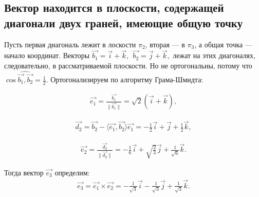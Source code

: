 \documentclass[12pt,a4paper]{article}
\begin{document}
\subsection{Вектор находится в плоскости, содержащей диагонали двух граней, имеющие общую точку}

Пусть первая диагональ лежит в лоскости $\pi_{2}$, вторая --- в $\pi_{3}$, а общая точка --- начало координат. Векторы $\vec{b_{1}}=\vec{i}+\vec{k},~~ \vec{b_{2}}=\vec{j}+\vec{k},$ лежат на этих диагоналях, следовательно, в рассматриваемой плоскости. Но не ортогональны, потому что $\cos{\widehat{\vec{b_{1}}, \vec{b_{2}}}}=\frac{1}{2}.$
Ортогонализируем по алгоритму Грама-Шмидта:

\begin{gather*}
\vec{e_{1}}=\frac{\vec{b_{1}}}{\|\vec{b_{1}}\|}=\sqrt{2}(\vec{i}+\vec{k}),
\end{gather*}

\begin{gather*}
	\vec{d_{2}}=\vec{b_{2}}-\langle \vec{e_{1}}, \vec{b_{2}} \rangle \vec{e_{1}}=-\frac{1}{2}\vec{i}+\vec{j}+\frac{1}{2}\vec{k},
 		\end{gather*}
		
\begin{gather*}
	\vec{e_{2}}=\frac{\vec{d_{2}}}{\|\vec{d_{2}}\|}=-\frac{1}{6}\vec{i}+\sqrt{\frac{2}{3}}\vec{j}+\frac{1}{\sqrt{6}}\vec{k}.
 		\end{gather*}

Тогда вектор $\vec{e_{3}}$ определим:
\begin{gather*}
	\vec{e_{3}}=\vec{e_{1}} \times \vec{e_{2}}=-\frac{1}{\sqrt{3}}\vec{i}-\frac{1}{\sqrt{3}}\vec{j}+\frac{1}{\sqrt{3}}\vec{k}.
\end{gather*}
\end{document}
